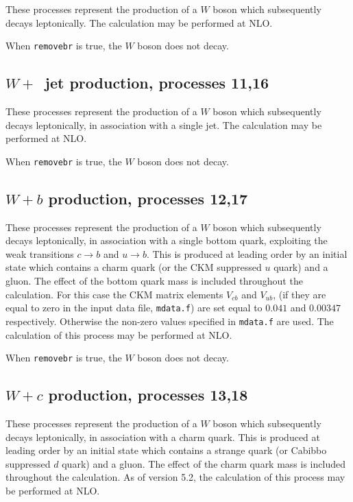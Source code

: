 \documentclass[12pt]{article}
\begin{document}
These processes represent the production of a $W$ boson which subsequently
decays leptonically. The calculation may be performed at NLO.

When {\tt removebr} is true, the $W$ boson does not decay.

\subsection{$W+$~jet production, processes 11,16}
\label{subsec:w1jet}

These processes represent the production of a $W$ boson which subsequently
decays leptonically, in association with a single jet.
The calculation may be performed at NLO.

When {\tt removebr} is true, the $W$ boson does not decay.

\subsection{$W+b$ production, processes 12,17}
\label{subsec:wb}

These processes represent the production of a $W$ boson which
subsequently decays leptonically, in association with a single bottom
quark, exploiting the weak transitions $c \to b$ and $u \to b$.
This is produced at leading order by an initial state which
contains a charm quark (or the CKM  suppressed $u$ quark) and a
gluon.  The effect of the bottom quark mass is included throughout the
calculation.  
For this case the CKM matrix elements $V_{cb}$ and $V_{ub}$,
(if they are equal to zero in the input data file, {\tt mdata.f})
are set equal to $0.041$ and $0.00347$ respectively. 
Otherwise the non-zero values specified in {\tt mdata.f} are used. 
The calculation of this process may
be performed at NLO.

When {\tt removebr} is true, the $W$ boson does not decay.

\subsection{$W+c$ production, processes 13,18}
\label{subsec:wc}

These processes represent the production of a $W$ boson which
subsequently decays leptonically, in association with a charm
quark. This is produced at leading order by an initial state which
contains a strange quark (or Cabibbo suppressed $d$ quark) and a
gluon.  The effect of the charm quark mass is included throughout the
calculation.  As of version 5.2, the calculation of this process may
be performed at NLO.
\end{document}

